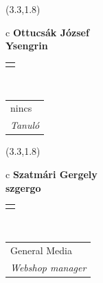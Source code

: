\documentclass[11pt]{article}
\begin{document}
\makebox(3.3,1.8){
  \renewcommand\arraystretch{1.3}
  \begin{tabular}[c]{c}
    \hspace{8.5mm}
    \LARGE\bf{ Ottucsák József }\\
    \hspace{8.5mm}
    \Large{ Ysengrin }\\
    \renewcommand\arraystretch{3}
    \begin{tabular}[c]{c}
      \centering
      \fontfamily{phv}\selectfont{
        \textbf{
          \textsc{
            \scriptsize{
            \color{Dark}{ Ismerkedő }\color{Bright}{ Webmester }\color{Bright}{ Sminkmester }\color{Bright}{ Programozó }
            }
          }
        }
      }
    \end{tabular}
    \\
    \renewcommand\arraystretch{1}
    \begin{tabular}{p{3.3in}}
      \hspace{.7cm}nincs\\
      \hspace{.7cm}\emph{ Tanuló }\\
    \end{tabular}
  \end{tabular}
}

\makebox(3.3,1.8){
  \renewcommand\arraystretch{1.3}
  \begin{tabular}[c]{c}
    \hspace{8.5mm}
    \LARGE\bf{ Szatmári Gergely }\\
    \hspace{8.5mm}
    \Large{ szgergo }\\
    \renewcommand\arraystretch{3}
    \begin{tabular}[c]{c}
      \centering
      \fontfamily{phv}\selectfont{
        \textbf{
          \textsc{
            \scriptsize{
            \color{Dark}{ Ismerkedő }\color{Bright}{ Webmester }\color{Bright}{ Sminkmester }\color{Bright}{ Programozó }
            }
          }
        }
      }
    \end{tabular}
    \\
    \renewcommand\arraystretch{1}
    \begin{tabular}{p{3.3in}}
      \hspace{.7cm}General Media\\
      \hspace{.7cm}\emph{ Webshop manager }\\
    \end{tabular}
  \end{tabular}
}
\end{document}
